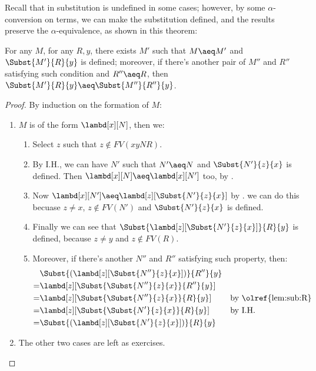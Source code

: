 \documentclass[../../../include/open-logic-section]{subfiles}
\begin{document}
Recall that in  substitution is
undefined in some cases; however, by some
$\alpha$-conversion on terms, we can make the substitution defined,
and the results preserve the $\alpha$-equivalence, as shown in this theorem:
\begin{thm}
  For any $M$, for any $R, y$, there exists $M'$
  such that $M \aeq M'$ and $\Subst{M'}{R}{y}$ is defined; moreover, if there's another pair of
  $M''$ and $R''$ satisfying such condition and $R'' \aeq R$, then $\Subst{M'}{R}{y} \aeq \Subst{M''}{R''}{y}$.
\end{thm}
\begin{proof}
  By induction on the formation of $M$:
  \begin{enumerate}
  \item $M$ is of the form $\lambd[x][N]$, then we:
    \begin{enumerate}
    \item Select $z$ such that $z \notin FV(xyNR)$.
    \item By I.H., we can have $N'$ such that $N' \aeq N$
      and $\Subst{N'}{z}{x}$ is defined. Then $\lambd[x][N] \aeq
      \lambd[x][N']$ too, by .
    \item Now $\lambd[x][N'] \aeq \lambd[z][\Subst{N'}{z}{x}]$ by .
      we can do this becuase $z \ne x$, $z \notin FV(N')$ and
      $\Subst{N'}{z}{x}$ is defined.
    \item Finally we can see that
      $\Subst{\lambd[z][\Subst{N'}{z}{x}]}{R}{y}$ is defined,
      because $z \neq y$ and $z \notin FV(R)$.
    \item Moreover, if there's another $N''$ and $R''$ satisfying such
      property, then:
      \begin{align*}
        &\Subst{(\lambd[z][\Subst{N''}{z}{x}])}{R''}{y}\\
        =&\lambd[z][\Subst{\Subst{N''}{z}{x}}{R''}{y}] \\
        =&\lambd[z][\Subst{\Subst{N''}{z}{x}}{R}{y}]
         && \text{by \olref{lem:sub:R}}\\
        =&\lambd[z][\Subst{\Subst{N'}{z}{x}}{R}{y}]
         && \text{by I.H.}\\
        =&\Subst{(\lambd[z][\Subst{N'}{z}{x}])}{R}{y}
      \end{align*}
    \end{enumerate}
  \item The other two cases are left as
    exercises. 
  \end{enumerate}
\end{proof}
\end{document}
